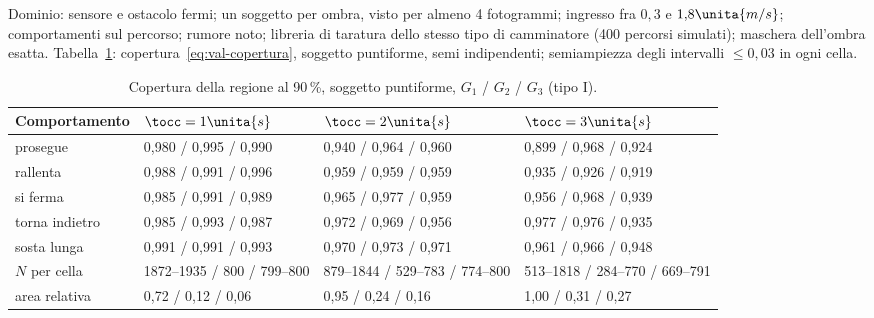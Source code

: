 Dominio: sensore e ostacolo fermi; un soggetto per ombra, visto per almeno 4 fotogrammi; ingresso fra $0{,}3$ e $1{,}8\unita{m/s}$; comportamenti sul percorso; rumore noto; libreria di taratura dello stesso tipo di camminatore (400 percorsi simulati); maschera dell'ombra esatta. Tabella~\ref{tab:val-copertura}: copertura~\eqref{eq:val-copertura}, soggetto puntiforme, semi indipendenti; semiampiezza degli intervalli $\le0{,}03$ in ogni cella.

\begin{table}[H]\centering\footnotesize
\caption{Copertura della regione al 90\,\%, soggetto puntiforme, $G_1$ / $G_2$ / $G_3$ (tipo I). }\label{tab:val-copertura}
\begin{tabular}{@{}llll@{}}
\toprule
Comportamento & $\tocc=1\unita{s}$ & $\tocc=2\unita{s}$ & $\tocc=3\unita{s}$\\
\midrule
prosegue & 0,980 / 0,995 / 0,990 & 0,940 / 0,964 / 0,960 & 0,899 / 0,968 / 0,924\\
rallenta & 0,988 / 0,991 / 0,996 & 0,959 / 0,959 / 0,959 & 0,935 / 0,926 / 0,919\\
si ferma & 0,985 / 0,991 / 0,989 & 0,965 / 0,977 / 0,959 & 0,956 / 0,968 / 0,939\\
torna indietro & 0,985 / 0,993 / 0,987 & 0,972 / 0,969 / 0,956 & 0,977 / 0,976 / 0,935\\
sosta lunga & 0,991 / 0,991 / 0,993 & 0,970 / 0,973 / 0,971 & 0,961 / 0,966 / 0,948\\
\midrule
$N$ per cella & 1872–1935 / 800 / 799–800 & 879–1844 / 529–783 / 774–800 & 513–1818 / 284–770 / 669–791\\
area relativa & 0,72 / 0,12 / 0,06 & 0,95 / 0,24 / 0,16 & 1,00 / 0,31 / 0,27\\
\bottomrule
\end{tabular}
\end{table}

